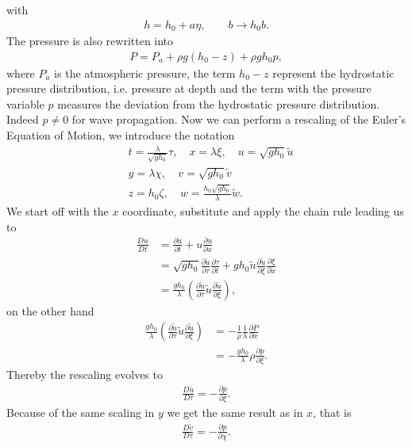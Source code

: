 with
\begin{align}
    h = h_0 + a \eta, \qquad  b \rightarrow h_0 b.
\end{align}
The pressure is also rewritten into
\begin{align}
    P = P_a + \rho g(h_0 -z) + \rho g h_0 p,
\end{align}
where $P_a$ is the atmospheric pressure, the term $h_0-z$ represent the
hydrostatic pressure distribution, i.e. pressure at depth and the term with the pressure
variable $p$  measures the deviation from the hydrostatic pressure
distribution. Indeed $p\neq 0 $ for wave propagation. Now we can perform a
rescaling of the Euler's Equation of Motion, we introduce the notation
\begin{align}
    &t = \frac{\lambda}{\sqrt{gh_0}}\tau,\quad x = \lambda \xi,\quad u =
    \sqrt{gh_0} \tilde{u}\\
    &y = \lambda \chi,\quad v = \sqrt{gh_0} \tilde{v}\\
    &z = h_0 \zeta, \quad w = \frac{h_0\sqrt{gh_0} }{\lambda}\tilde{w}.
\end{align}
We start off with the $x$ coordinate, substitute and apply the chain rule
leading us to
\begin{align}
    \frac{Du}{Dt}
    &= \frac{\partial u}{\partial t} +u \frac{\partial
    u}{\partial x} \\
    &= \sqrt{gh_{0}}\frac{\partial \tilde{u}}{\partial \tau} \frac{\partial
    \tau}{\partial t} +gh_0 \tilde{u} \frac{\partial \tilde{u}}{\partial \xi}
    \frac{\partial \xi}{\partial x} \\
    &= \frac{gh_0}{\lambda} \left( \frac{\partial \tilde{u}}{\partial \tau}
    \tilde{u} \frac{\partial \tilde{u}}{\partial \xi} \right),
\end{align}
on the other hand
\begin{align}
    \frac{gh_0}{\lambda} \left( \frac{\partial \tilde{u}}{\partial \tau}
    \tilde{u} \frac{\partial \tilde{u}}{\partial \xi} \right)
    &=-\frac{1}{\rho}\frac{1}{\lambda}\frac{\partial P}{\partial x} \\
    &=-\frac{ g h_0 }{\lambda}\rho \frac{\partial p}{\partial \xi}.
\end{align}
Thereby the rescaling evolves to
\begin{align}
    \frac{D \tilde{u}}{D\tau} = -\frac{\partial p}{\partial \xi}.
\end{align}
Because of the same scaling in $y$ we get the same result as in $x$, that is
\begin{align}
    \frac{D \tilde{v}}{D\tau} = -\frac{\partial p}{\partial \chi}.
\end{align}
